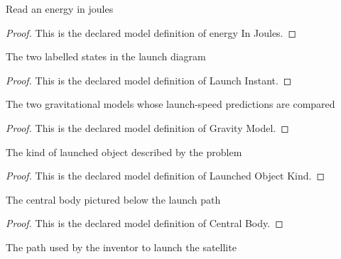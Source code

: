 \begin{definition}
  \label{def:physics:phyx-mini-0715:phyxminiproblems-problemphyxmini0715-energyinjoules}
  Read an energy in joules
\end{definition}
\begin{proof}
  This is the declared model definition of energy In Joules.
\end{proof}
\begin{definition}
  \label{def:physics:phyx-mini-0715:phyxminiproblems-problemphyxmini0715-launchinstant}
  The two labelled states in the launch diagram
\end{definition}
\begin{proof}
  This is the declared model definition of Launch Instant.
\end{proof}
\begin{definition}
  \label{def:physics:phyx-mini-0715:phyxminiproblems-problemphyxmini0715-gravitymodel}
  The two gravitational models whose launch-speed predictions are compared
\end{definition}
\begin{proof}
  This is the declared model definition of Gravity Model.
\end{proof}
\begin{definition}
  \label{def:physics:phyx-mini-0715:phyxminiproblems-problemphyxmini0715-launchedobjectkind}
  The kind of launched object described by the problem
\end{definition}
\begin{proof}
  This is the declared model definition of Launched Object Kind.
\end{proof}
\begin{definition}
  \label{def:physics:phyx-mini-0715:phyxminiproblems-problemphyxmini0715-centralbody}
  The central body pictured below the launch path
\end{definition}
\begin{proof}
  This is the declared model definition of Central Body.
\end{proof}
\begin{definition}
  \label{def:physics:phyx-mini-0715:phyxminiproblems-problemphyxmini0715-launchpath}
  The path used by the inventor to launch the satellite
\end{definition}
